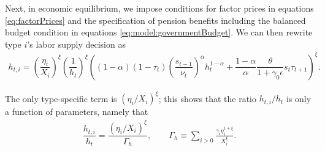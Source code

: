Next, in economic equilibrium, we impose conditions for factor prices in equations \eqref{eq:factorPrices} and the specification of pension benefits including the balanced budget condition in equations \eqref{eq:model:governmentBudget}. We can then rewrite type $i$'s labor supply decision as
\begin{align*}
    h_{t,i} = \left(\dfrac{\eta_i}{X_i}\right)^{\xi}\left(\dfrac{1}{h_t}\right)^{\xi}\left((1-\alpha)(1-\tau_t)\left(\dfrac{s_{t-1}}{\nu_t}\right)^{\alpha}h_t^{1-\alpha}+\dfrac{1-\alpha}{\alpha}\dfrac{\theta}{1+\gamma_0 \epsilon} s_t\tau_{t+1}\right)^{\xi}.
\end{align*}


The only type-specific term is $(\eta_i/X_i)^{\xi}$; this shows that the ratio $h_{t,i}/h_t$ is only a function of parameters, namely that
\begin{align}\label{eq:hi_h}
    \dfrac{h_{t,i}}{h_t} = \dfrac{(\eta_i/X_i)^{\xi}}{\Gamma_h}, \qquad \Gamma_{h} \equiv \sum_{i>0}\frac{\gamma_{i}\eta_{i}^{1+\xi}}{X_{i}^{\xi}}.
\end{align}


